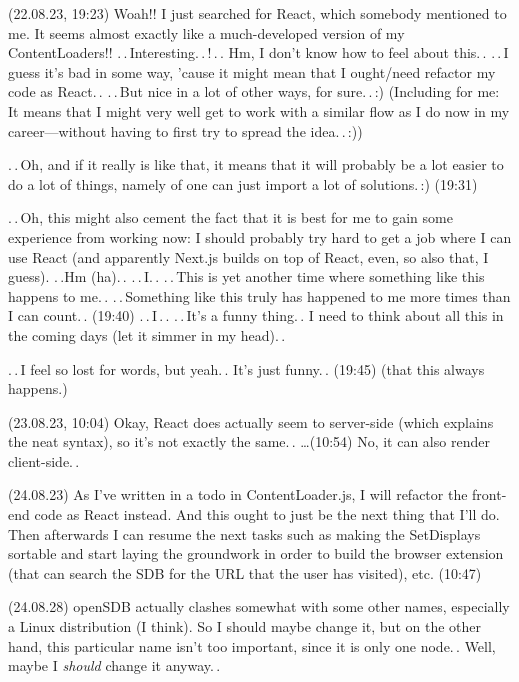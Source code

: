 \documentclass{report}
\begin{document}


(22.08.23, 19:23) Woah!! I just searched for React, which somebody mentioned to me. It seems almost exactly like a much-developed version of my ContentLoaders!! .\,.\,Interesting.\,.\,!\,.\,. Hm, I don't know how to feel about this.\,. .\,.\,I guess it's bad in some way, 'cause it might mean that I ought/need refactor my code as React.\,. .\,.\,But nice in a lot of other ways, for sure.\,.\,:) (Including for me: It means that I might very well get to work with a similar flow as I do now in my career---without having to first try to spread the idea.\,.\,:))

.\,.\,Oh, and if it really is like that, it means that it will probably be a lot easier to do a lot of things, namely of one can just import a lot of solutions.\,:) (19:31)

.\,.\,Oh, this might also cement the fact that it is best for me to gain some experience from working now: I should probably try hard to get a job where I can use React (and apparently Next.js builds on top of React, even, so also that, I guess). .\,.Hm (ha).\,. .\,.\,I.\,. .\,.\,This is yet another time where something like this happens to me.\,. .\,.\,Something like this truly has happened to me more times than I can count.\,. (19:40) .\,.\,I\,.\,. .\,.\,It's a funny thing.\,. I need to think about all this in the coming days (let it simmer in my head).\,.

.\,.\,I feel so lost for words, but yeah.\,. It's just funny.\,. (19:45) (that this always happens.)

(23.08.23, 10:04) Okay, React does actually seem to server-side (which explains the neat syntax), so it's not exactly the same.\,. \ldots (10:54) No, it can also render client-side.\,.


(24.08.23) As I've written in a todo in ContentLoader.js, I will refactor the front-end code as React instead. And this ought to just be the next thing that I'll do. Then afterwards I can resume the next tasks such as making the SetDisplays sortable and start laying the groundwork in order to build the browser extension (that can search the SDB for the URL that the user has visited), etc. (10:47)

(24.08.28) openSDB actually clashes somewhat with some other names, especially a Linux distribution (I think). So I should maybe change it, but on the other hand, this particular name isn't too important, since it is only one node.\,. Well, maybe I \emph{should} change it anyway.\,.
\end{document}
